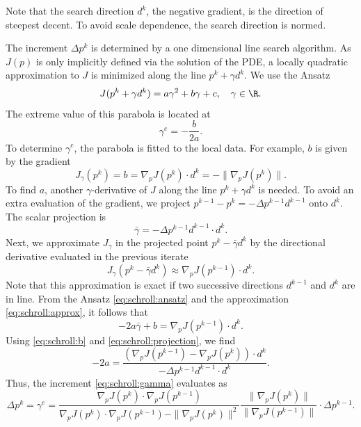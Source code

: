 Note that the search direction $d^k$, the negative gradient, is the
direction of steepest decent.  To avoid scale dependence, the search
direction is normed.

The increment $\Delta p^k$ is determined by a one dimensional line
search algorithm.  As $J(p)$ is only implicitly defined via the
solution of the PDE, a locally quadratic approximation to $J$ is
minimized along the line $p^k + \gamma d^k$.  We use the Ansatz
\begin{equation}\label{eq:schroll:ansatz}
 J(p^k + \gamma d^k) = a \gamma^2 + b \gamma + c, \quad \gamma \in \R.
\end{equation}
The extreme value of this parabola is located at
\begin{equation} \label{eq:schroll:gamma}
 \gamma^e = - \frac{b}{2a}.
\end{equation}
To determine $\gamma^e$, the parabola is fitted to the local data.
For example, $b$ is given by the gradient
\begin{equation}\label{eq:schroll:b}
 J_\gamma(p^k) = b = \nabla_p J(p^k) \cdot d^k = - \| \nabla_p J(p^k) \|.
\end{equation}
To find $a$, another $\gamma$-derivative of $J$ along the line $p^k
+ \gamma d^k$ is needed.  To avoid an extra evaluation of the
gradient, we project $p^{k-1}-p^{k}=-\Delta p^{k-1}d^{k-1}$ onto
$d^{k}$.  The scalar projection is
\begin{equation}\label{eq:schroll:projection}
 \bar\gamma = -\Delta p^{k-1} d^{k-1} \cdot d^k.
\end{equation}
Next, we approximate $J_\gamma$ in the projected point $p^k-\bar\gamma d^k$
by the directional derivative evaluated in the previous iterate
\begin{equation} \label{eq:schroll:approx}
 J_\gamma(p^k-\bar\gamma d^k) \approx \nabla_p J(p^{k-1}) \cdot d^k .
\end{equation}
Note that this approximation is exact
if two successive directions $d^{k-1}$ and $d^k$ are in line.
From the Ansatz \eqref{eq:schroll:ansatz} and the approximation
\eqref{eq:schroll:approx}, it follows that
\begin{equation}
 -2a \bar\gamma +b = \nabla_p J(p^{k-1}) \cdot d^k.
\end{equation}
Using \eqref{eq:schroll:b} and \eqref{eq:schroll:projection}, we find
\begin{equation}
 -2 a =
 \frac{(\nabla_p J(p^{k-1}) - \nabla_p J(p^k))\cdot d^k}
      {-\Delta p^{k-1} d^{k-1} \cdot d^k}.
\end{equation}
Thus, the increment \eqref{eq:schroll:gamma} evaluates as
\begin{equation}
 \Delta p^k = \gamma^e =
 \frac{\nabla_p J(p^k)\cdot \nabla_p J(p^{k-1})}
      {\nabla_p J(p^k)\cdot \nabla_p J(p^{k-1}) - \|\nabla_p J(p^k)\|^2}
 \frac{\|\nabla_p J(p^k)\|}{\|\nabla_p J(p^{k-1})\|} \cdot
 \Delta p^{k-1}.
\end{equation}


